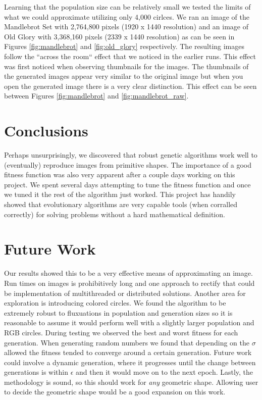 \documentclass[12pt]{article}
\begin{document}
Learning that the population size can be relatively small we tested the limits of what we could approximate utilizing only 4,000 cirlces. We ran an image of the Mandlebrot Set with 2,764,800 pixels (1920 x 1440 resolution) and an image of Old Glory with 3,368,160 pixels (2339 x 1440 resolution) as can be seen in Figures \ref{fig:mandlebrot} and \ref{fig:old_glory} respectively. The resulting images follow the ``across the room`` effect that we noticed in the earlier runs. This effect was first noticed when observing thumbnails for the images. The thumbnails of the generated images appear very similar to the original image but when you open the generated image there is a very clear distinction. This effect can be seen between Figures \ref{fig:mandlebrot} and \ref{fig:mandlebrot_raw}.


\section*{Conclusions}
Perhaps unsurprisingly, we discovered that robust genetic algorithms work well to (eventually) reproduce images from primitive shapes. The importance of a good fitness function was also very apparent after a couple days working on this project. We spent several days attempting to tune the fitness function and once we tuned it the rest of the algorithm just worked. This project has handily showed that evolutionary algorithms are very capable tools (when corralled correctly) for solving problems without a hard mathematical definition. 

\section*{Future Work}
Our results showed this to be a very effective means of approximating an image. Run times on images is prohibitively long and one approach to rectify that could be implementation of multithreaded or distributed solutions. Another area for exploration is introducing colored circles. We found the algorithm to be extremely robust to fluxuations in population and generation sizes so it is reasonable to assume it would perform well with a slightly larger population and RGB circles. During testing we observed the best and worst fitness for each generation. When generating random numbers we found that depending on the $\sigma$ allowed the fitness tended to converge around a certain generation. Future work could involve a dynamic generation, where it progresses until the change between generations is within $\epsilon$ and then it would move on to the next epoch. Lastly, the methodology is sound, so this should work for \textit{any} geometric shape. Allowing user to decide the geometric shape would be a good expansion on this work.
\end{document}
